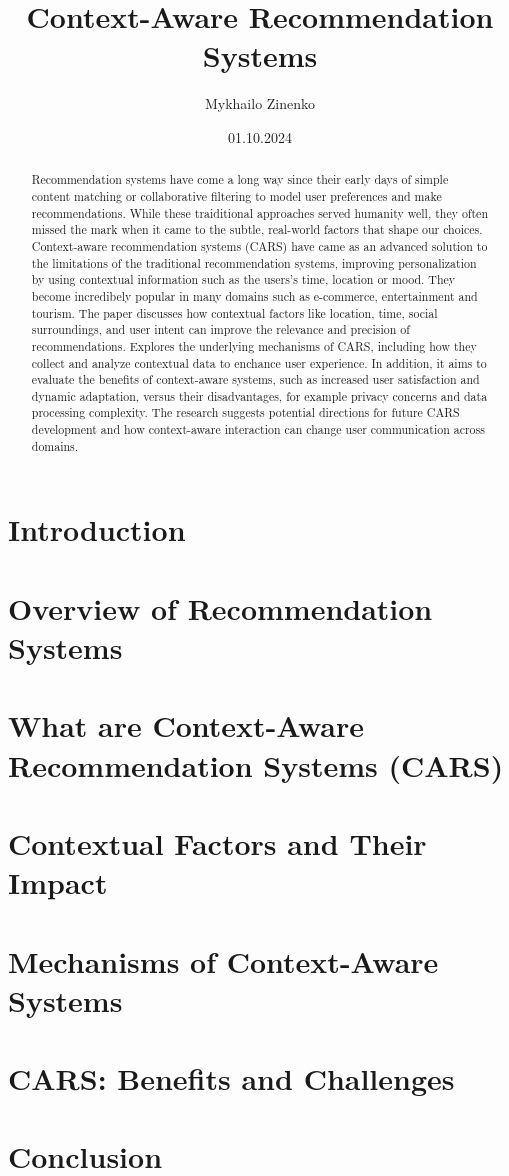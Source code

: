 \documentclass[11pt]{article} %
\title{Context-Aware Recommendation Systems}
\author{Mykhailo Zinenko}
\date{01.10.2024} %
\begin{document}
\maketitle

\begin{abstract}
Recommendation systems have come a long way since their early days of simple content matching or collaborative filtering to model user preferences and make recommendations. While these traiditional approaches served humanity well, they often missed the mark when it came to the subtle, real-world factors that shape our choices. Context-aware recommendation systems (CARS) have came as an advanced solution to the limitations of the traditional recommendation systems, improving personalization by using contextual information such as the users's time, location or mood. They become incredibely popular in many domains such as e-commerce, entertainment and tourism. The paper discusses how contextual factors like location, time, social surroundings, and user intent can improve the relevance and precision of recommendations. Explores the underlying mechanisms of CARS, including how they collect and analyze contextual data to enchance user experience. In addition, it aims to evaluate the benefits of context-aware systems, such as increased user satisfaction and dynamic adaptation, versus their disadvantages, for example privacy concerns and data processing complexity. The research suggests potential directions for future CARS development and how context-aware interaction can change user communication across domains. \cite{CARRIZO2017194}\cite{KULKARNI2020100255}
\end{abstract}

\section{Introduction}

\section{Overview of Recommendation Systems}

\section{What are Context-Aware Recommendation Systems (CARS)}

\section{Contextual Factors and Their Impact}

\section{Mechanisms of Context-Aware Systems}

\section{CARS: Benefits and Challenges}

\section{Conclusion}



\end{document}
